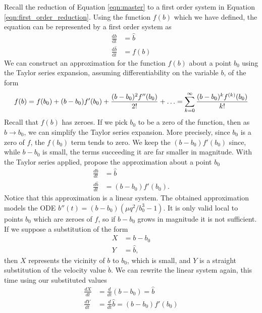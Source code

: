 Recall the reduction of Equation \ref{eqn:master} to a first order system in Equation \ref{eqn:first_order_reduction}.
Using the function $f(b)$ which we have defined, the equation can be represented by a first order system as
\begin{align}
    \frac{\mathrm{d}b}{\mathrm{d}t} &= \hat{b} \\
    \frac{\mathrm{d}\hat{b}}{\mathrm{d}t} & = f(b)
    \label{eqn:first_order_modified}
\end{align}
We can construct an approximation for the function $f(b)$ about a point $b_0$ using the Taylor series expansion, assuming differentiability on the variable $b$, of the form
\begin{equation}
    f(b) = f(b_0) + (b-b_0)f'(b_0) + \frac{(b-b_0)^2 f''(b_0)}{2!} + \mathellipsis = \sum_{k=0}^\infty\frac{(b-b_0)^{k}f^{(k)}(b_0)}{k!}
    \label{eqn:taylor_series}
\end{equation}
Recall that $f(b)$ has zeroes. If we pick $b_0$ to be a zero of the function, then as $b\rightarrow b_0$,
we can simplify the Taylor series expansion.
More precisely, since $b_0$ is a zero of $f$, the $f(b_0)$ term tends to zero.
We keep the $(b-b_0)f'(b_0)$ since, while $b-b_0$ is small,
the terms succeeding it are far smaller in magnitude.
With the Taylor series applied, propose the approximation about a point $b_0$
\begin{align}
    \frac{db}{dt}       & = \hat{b}         \\
    \frac{d\hat{b}}{dt} & = (b-b_0)f'(b_0).
    \label{eqn:first_order_approximated}
\end{align}
Notice that this approximation is a linear system. The obtained approximation models the ODE $b''(t) = (b-b_0)(\mu q^2/b_0^3-1)$.
It is only valid local to points $b_0$ which are zeroes of $f$, so if $b-b_0$ grows in magnitude it is not sufficient.
If we suppose a substitution of the form
\begin{align}
    X & = b - b_0  \\
    Y & = \hat{b},
\end{align}
then $X$ represents the vicinity of $b$ to $b_0$, which is small,
and $Y$ is a straight substitution of the velocity value $\dot{b}$.
We can rewrite the linear system again, this time using our substituted values
\begin{align}
    \frac{dX}{dt} & = \frac{d}{dt}\left(b-b_0\right) = \hat{b} \\
    \frac{dY}{dt} & = \frac{d}{dt}\hat{b} = (b-b_0)f'(b_0)
\end{align}
